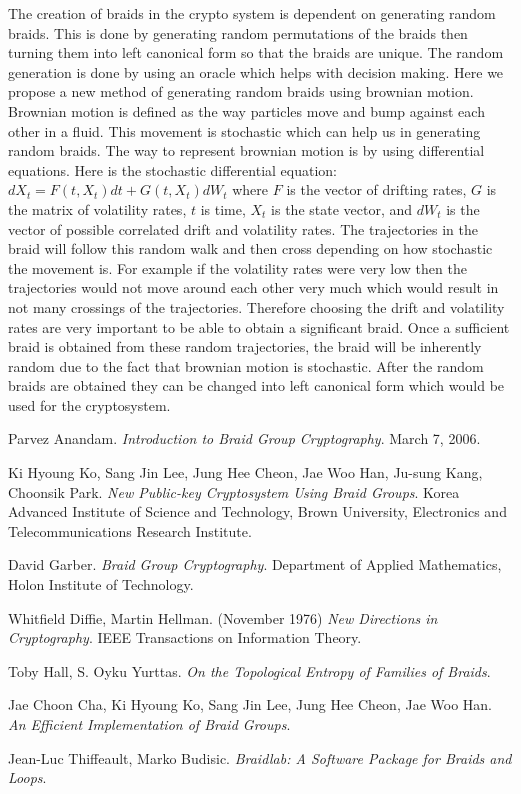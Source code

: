 \documentclass{article}
\theoremstyle{definition}
\begin{document}
The creation of braids in the crypto system is dependent on generating random braids. This is done by generating random permutations of the braids then turning them into left canonical form so that the braids are unique. The random generation is done by using an oracle which helps with decision making. Here we propose a new method of generating random braids using brownian motion. Brownian motion is defined as the way particles move and bump against each other in a fluid. This movement is stochastic which can help us in generating random braids. The way to represent brownian motion is by using differential equations. Here is the stochastic differential equation: $dX_t=F(t,X_t) dt+G(t,X_t) dW_t$ where $F$ is the vector of drifting rates, $G$ is the matrix of volatility rates, $t$ is time, $X_t$ is the state vector, and $dW_t$ is the vector of possible correlated drift and volatility rates. The trajectories in the braid will follow this random walk and then cross depending on how stochastic the movement is. For example if the volatility rates were very low then the trajectories would not move around each other very much which would result in not many crossings of the trajectories. Therefore choosing the drift and volatility rates are very important to be able to obtain a significant braid. Once a sufficient braid is obtained from these random trajectories, the braid will be inherently random due to the fact that brownian motion is stochastic. After the random braids are obtained they can be changed into left canonical form which would be used for the cryptosystem. 



\begin{thebibliography}{9}

Parvez Anandam. 
\textit{Introduction to Braid Group Cryptography}. 
March 7, 2006.
 
Ki Hyoung Ko, Sang Jin Lee, Jung Hee Cheon, Jae Woo Han, Ju-sung Kang, Choonsik Park.
\textit{New Public-key Cryptosystem Using Braid Groups}.
Korea Advanced Institute of Science and Technology, Brown University, Electronics and Telecommunications Research Institute. 

David Garber.
\textit{Braid Group Cryptography}.
Department of Applied Mathematics, Holon Institute of Technology. 
 
Whitfield Diffie, Martin Hellman. (November 1976)
\textit{New Directions in Cryptography}.
IEEE Transactions on Information Theory.


Toby Hall, S. Oyku Yurttas.
\textit{On the Topological Entropy of Families of Braids}.

Jae Choon Cha, Ki Hyoung Ko, Sang Jin Lee, Jung Hee Cheon, Jae Woo Han.
\textit{An Efficient Implementation of Braid Groups}.

Jean-Luc Thiffeault, Marko Budisic.
\textit{Braidlab: A Software Package for Braids and Loops}.

\end{thebibliography}






	
\end{document}
